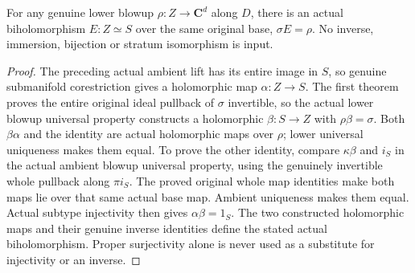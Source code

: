 \begin{theorem}
\label{hir:actual-plane-contact-strict-biholomorphism}
\leanok
For any genuine lower blowup $\rho:Z\to\mathbf C^d$ along $D$, there
is an actual biholomorphism $E:Z\simeq S$ over the same original base,
$\sigma E=\rho$. No inverse, immersion, bijection or stratum isomorphism
is input.
\end{theorem}
\begin{proof}
The preceding actual ambient lift has its entire image in $S$, so genuine
submanifold corestriction gives a holomorphic map $\alpha:Z\to S$.
The first theorem proves the entire original ideal pullback of $\sigma$
invertible, so the actual lower blowup universal property constructs a
holomorphic $\beta:S\to Z$ with $\rho\beta=\sigma$.
Both $\beta\alpha$ and the identity are actual holomorphic maps over
$\rho$; lower universal uniqueness makes them equal. To prove the other
identity, compare $\kappa\beta$ and $i_S$ in the actual ambient blowup
universal property, using the genuinely invertible whole pullback along
$\pi i_S$. The proved original whole map identities make both maps lie
over that same actual base map. Ambient uniqueness makes them equal.
Actual subtype injectivity then gives $\alpha\beta=1_S$. The two
constructed holomorphic maps and their genuine inverse identities define
the stated actual biholomorphism. Proper surjectivity alone is never used
as a substitute for injectivity or an inverse.
\end{proof}

